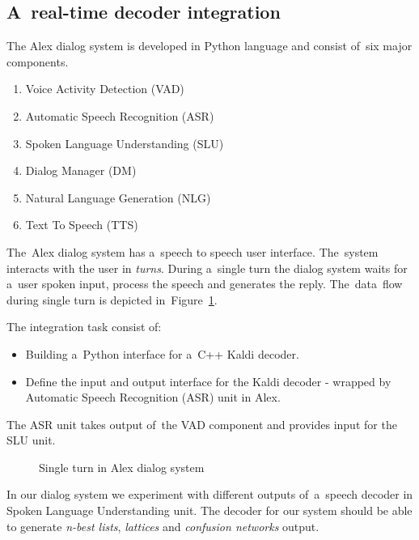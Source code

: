 {\subsection{A~real-time decoder integration} 
\label{sub:integration}
The Alex dialog system is developed in Python language and consist of~six major components. 
\begin{enumerate}
    \item Voice Activity Detection (VAD)
    \item Automatic Speech Recognition (ASR) 
    \item Spoken Language Understanding (SLU)
    \item Dialog Manager (DM)
    \item Natural Language Generation (NLG)
    \item Text To Speech (TTS)
\end{enumerate}
The~Alex dialog system has a~speech to speech user interface. The~system interacts with the user in {\it turns}. During a~single turn the dialog system waits for a~user spoken input, process the speech and generates the reply.
The~data~flow during single turn is depicted in~Figure~\ref{fig:dialog_system}.

The integration task consist of:
\begin{itemize}
    \item Building a~Python interface for a~C++ Kaldi decoder.
    \item Define the input and output interface for the Kaldi decoder - wrapped by Automatic Speech Recognition (ASR) unit in Alex.
\end{itemize}
 The ASR unit takes output of~the VAD component and provides input for the SLU unit. 

\begin{figure}
    \begin{center}
    
    \caption{Single turn in Alex dialog system}
    \label{fig:dialog_system} 
    \end{center}
\end{figure}

In our dialog system we experiment with different outputs of~a~speech decoder in Spoken Language Understanding unit. 
The decoder for our system should be able to generate {\it n-best lists}, {\it lattices} and {\it confusion networks} output.

}
